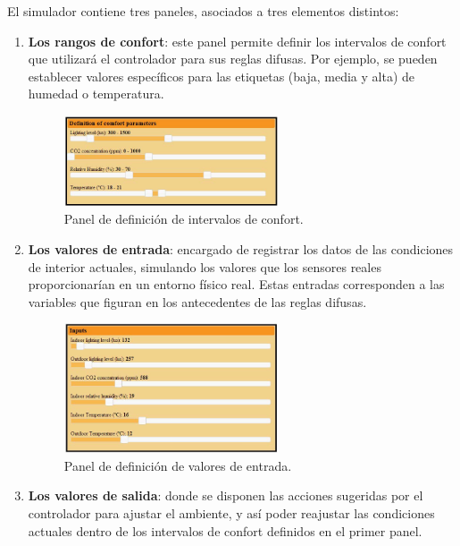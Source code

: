 El simulador contiene tres paneles, asociados a tres elementos distintos:
\begin{enumerate}
	\item \textbf{Los rangos de confort}: este panel permite definir los intervalos de confort que utilizará el controlador para sus reglas difusas. Por ejemplo, se pueden establecer valores específicos para las etiquetas (baja, media y alta) de humedad o temperatura.
	
	\begin{figure}[H]
		\centering
		\includegraphics[width=0.6\textwidth]{imgs/simulator-comfort-params.JPG}
		\caption{Panel de definición de intervalos de confort.}
		\label{fig:simulator-comfort-params}
	\end{figure}
	
	\item \textbf{Los valores de entrada}: encargado de registrar los datos de las condiciones de interior actuales, simulando los valores que los sensores reales proporcionarían en un entorno físico real. Estas entradas corresponden a las variables que figuran en los antecedentes de las reglas difusas.
	
	\begin{figure}[H]
		\centering
		\includegraphics[width=0.6\textwidth]{imgs/simulator-panel-inputs.JPG}
		\caption{Panel de definición de valores de entrada.}
		\label{fig:simulator-panel-inputs}
	\end{figure}
	
	\item \textbf{Los valores de salida}: donde se disponen las acciones sugeridas por el controlador para ajustar el ambiente, y así poder reajustar las condiciones actuales dentro de los intervalos de confort definidos en el primer panel.
	

\end{enumerate}
